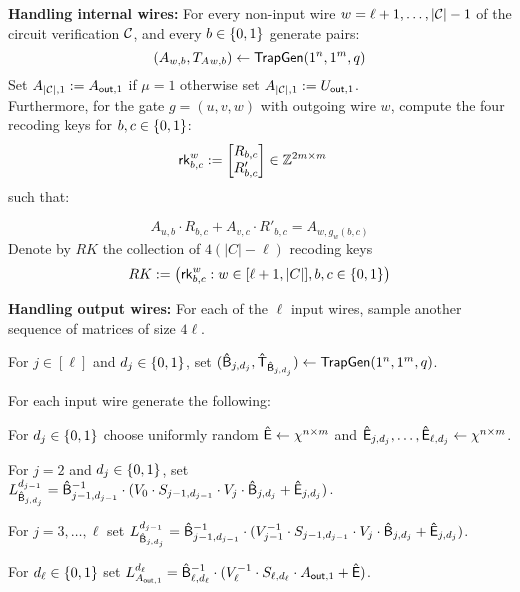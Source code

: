 {\bf Handling internal wires:} For every non-input wire $w = \ell+1,\ldots,|{\cal C}|-1$ of the circuit verification ${\cal C}$, and every $b\in\{0,1\}$ generate pairs:
$$ (A_{w,b}, T_A{_{w,b}})\leftarrow {\mathsf{TrapGen}}(1^n,1^m,q)$$
Set $A_{|{\cal C}|,1}:=A_{\mathsf{out},1}$ if $\mu=1$ otherwise set $A_{|{\cal C}|,1}:=U_{\mathsf{out},1}$.\\
Furthermore, for the gate $g = (u, v,w)$ with outgoing wire $w$, compute the four recoding keys  for $b,c\in\{0,1\}$: \begin{align*}
    {\mathsf{rk}}^w_{b,c} &:= \begin{bmatrix}
          R_{b,c} \\
          R'_{b,c} \\
         \end{bmatrix} \in \mathbb{Z}^{2m\times m}
  \end{align*}
 such that: 





$$A_{u,b}\cdot R_{b,c}+A_{v,c}\cdot R'_{b,c}=A_{w,g_w(b,c)}$$
Denote by $RK$ the collection of $4(|C|-\ell)$ recoding keys
$$RK := \big({\mathsf{rk}}^w_{b,c}: w\in[\ell+1,|C|],b,c\in\{0,1\} \big)$$

{\bf Handling output wires:} For each of the $\ell$ input wires, sample another sequence of matrices of size $4\ell$. 
\BI
\item For $j \in [\ell]$ and $d_j\in\{0,1\}$, set $(\mathsf{\hat{B}}_{j,d_j}, \mathsf{\hat{T}}_{\mathsf{\hat{B}}_{j,d_j}})\leftarrow {\mathsf{TrapGen}}(1^n,1^m,q)$.


\EI
For each input wire generate the following: 
\BI
\item For $d_j\in\{0,1\}$ choose uniformly random $\mathsf{\hat{E}}\leftarrow\chi^{n\times m}$ and $\mathsf{\hat{E}}_{j,d_j},\ldots,\mathsf{\hat{E}}_{\ell,d_j}\leftarrow\chi^{n\times m}$. 
\item For $j=2$ and $d_j\in\{0,1\}$, set $L_{\mathsf{\hat{B}}_{j,d_j}}^{d_{j-1}}=\mathsf{\hat{B}}_{j-1,d_{j-1}}^{-1}\cdot ( V_0\cdot S_{j-1,d_{j-1}}\cdot V_{j}\cdot \mathsf{\hat{B}}_{j,d_j}+\mathsf{\hat{E}}_{j,d_j})$.

\item For $j=3,\ldots,\ell$ set $L^{d_{j-1}}_{\mathsf{\hat{B}}_{j,d_j}}=\mathsf{\hat{B}}_{j-1,d_{j-1}}^{-1}\cdot (V_{j-1}^{-1}\cdot S_{j-1,d_{j-1}}\cdot V_j\cdot \mathsf{\hat{B}}_{j,d_j}+\mathsf{\hat{E}}_{j,d_j})$.
\item For $d_{\ell}\in\{0,1\}$ set $L_{A_{\mathsf{out},1}}^{d_{\ell}}= \mathsf{\hat{B}}_{\ell,d_{\ell}}^{-1}\cdot (V_\ell^{-1}\cdot S_{\ell,d_{\ell}}\cdot A_{\mathsf{out},1}+\mathsf{\hat{E}})$.     


